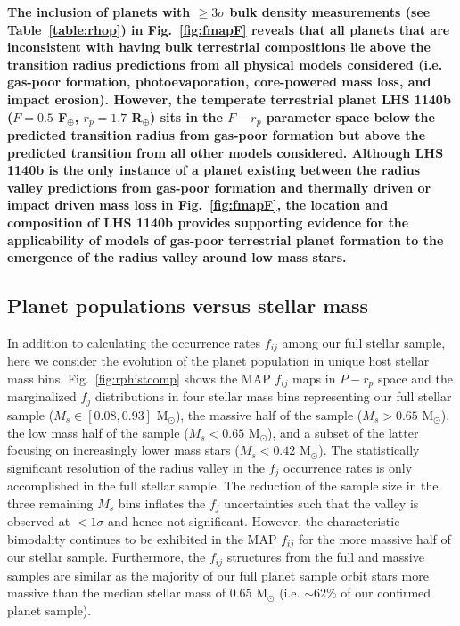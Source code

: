 \documentclass[twocolumn]{emulateapj}
\begin{document}
\textbf{The inclusion of planets with $\geq 3\sigma$ bulk density measurements (see Table~\ref{table:rhop}) in
  Fig.~\ref{fig:fmapF} reveals that all planets that are inconsistent with having bulk terrestrial
  compositions lie above the transition radius predictions from all physical models considered
  (i.e. gas-poor formation, photoevaporation, core-powered mass loss, and impact erosion). However, the
  temperate terrestrial planet LHS 1140b ($F=0.5$ F$_{\oplus}$, $r_p=1.7$ R$_{\oplus}$) sits in the $F-r_p$ parameter
  space below the predicted transition radius from gas-poor formation but above the predicted transition from all
  other models considered. Although LHS 1140b is the only instance of a planet
  existing between the radius valley predictions from gas-poor formation and thermally driven or impact driven
  mass loss in Fig.~\ref{fig:fmapF}, the location and composition of LHS 1140b
  provides supporting evidence for the applicability of models of 
  gas-poor terrestrial planet formation to the emergence of the radius valley around low mass stars.}

\subsection{Planet populations versus stellar mass} \label{sect:Msbin}
In addition to calculating the occurrence rates $f_{ij}$ among our full stellar sample, here we consider
the evolution of the planet population in unique host stellar mass bins. Fig.~\ref{fig:rphistcomp} shows
the MAP $f_{ij}$ maps in $P-r_p$ space and the marginalized $f_j$ distributions in four stellar mass bins
representing our full stellar sample
($M_s \in [0.08,0.93]$ M$_{\odot}$), the massive half of the sample ($M_s>0.65$ M$_{\odot}$),  
the low mass half of the sample ($M_s<0.65$ M$_{\odot}$), and a subset of the latter focusing on
increasingly lower mass stars ($M_s<0.42$ M$_{\odot}$). The statistically significant resolution of the
radius valley in the $f_j$ occurrence rates is only accomplished in the full stellar sample. The reduction
of the sample size in the three remaining $M_s$ bins inflates the $f_j$ uncertainties such that the valley
is observed at $<1\sigma$ and hence not significant. However, the characteristic bimodality continues to be
exhibited in the
MAP $f_{ij}$ for the more massive half of our stellar sample. Furthermore, the $f_{ij}$ structures from
the full and massive samples are similar
as the majority of our full planet sample orbit stars more massive than the median stellar mass of 0.65
M$_{\odot}$ (i.e. $\sim 62$\% of our confirmed planet sample).
\end{document}
